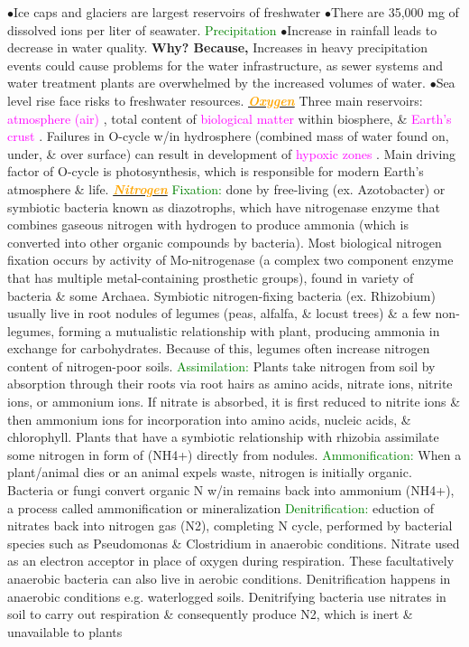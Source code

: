 \documentclass{article}
\newcommand{\ddd}{$\bullet$}
\newcommand{\green}[1]{\textcolor{green}{#1}}
\newcommand{\pink}[1]{\textcolor{magenta}{#1}}
\newcommand{\orange}[1]{\textcolor{orange}{#1}}
\newcommand{\mysubsection}[1]{\underline{\textbf{{\textit{\orange{#1}}}}}}
\newcommand{\mysubsub}[1]{{{\green{#1}}}}
\begin{document}
\begin{multicols*}{4}
			\ddd Ice caps and glaciers are largest reservoirs of freshwater 
			\ddd There are 35,000 mg of dissolved ions per liter of seawater.
				\mysubsub{Precipitation}
				\ddd Increase in rainfall leads to decrease in water quality. \textbf{Why? Because, } Increases in heavy precipitation events could cause problems for the water infrastructure, as sewer systems and water treatment plants are overwhelmed by the increased volumes of water. 
				\ddd Sea level rise face risks to freshwater resources.
		\mysubsection{Oxygen}
		Three main reservoirs: \pink{ atmosphere (air) }, total content of \pink{ biological matter } within biosphere, \& \pink{ Earth's crust }. Failures in O-cycle w/in hydrosphere (combined mass of water found on, under, \& over surface) can result in development of \pink{ hypoxic zones }. Main driving factor of O-cycle is photosynthesis, which is responsible for modern Earth's atmosphere \& life. 
		\mysubsection{Nitrogen}
			\mysubsub{Fixation: } 
				done by free-living (ex. Azotobacter) or symbiotic bacteria known as diazotrophs, which have nitrogenase enzyme that combines gaseous nitrogen with hydrogen to produce ammonia (which is converted into other organic compounds by bacteria). Most biological nitrogen fixation occurs by activity of Mo-nitrogenase (a complex two component enzyme that has multiple metal-containing prosthetic groups), found in variety of bacteria \& some Archaea. Symbiotic nitrogen-fixing bacteria (ex. Rhizobium) usually live in root nodules of legumes (peas, alfalfa, \& locust trees) \& a few non-legumes, forming a mutualistic relationship with plant, producing ammonia in exchange for carbohydrates. Because of this, legumes often increase nitrogen content of nitrogen-poor soils.
			\mysubsub{Assimilation: }
				Plants take nitrogen from soil by absorption through their roots via root hairs as amino acids, nitrate ions, nitrite ions, or ammonium ions. If nitrate is absorbed, it is first reduced to nitrite ions \& then ammonium ions for incorporation into amino acids, nucleic acids, \& chlorophyll. Plants that have a symbiotic relationship with rhizobia assimilate some nitrogen in form of (NH4+) directly from nodules.
			\mysubsub{Ammonification: }
				When a plant/animal dies or an animal expels waste, nitrogen is initially organic. Bacteria or fungi convert organic N w/in remains back into ammonium (NH4+), a process called ammonification or mineralization
			\mysubsub{Denitrification: }
				eduction of nitrates back into nitrogen gas (N2), completing N cycle, performed by bacterial species such as Pseudomonas \& Clostridium in anaerobic conditions. Nitrate used as an electron acceptor in place of oxygen during respiration. These facultatively anaerobic bacteria can also live in aerobic conditions. Denitrification happens in anaerobic conditions e.g. waterlogged soils. Denitrifying bacteria use nitrates in soil to carry out respiration \& consequently produce N2, which is inert \& unavailable to plants 

\end{multicols*}
\end{document}
